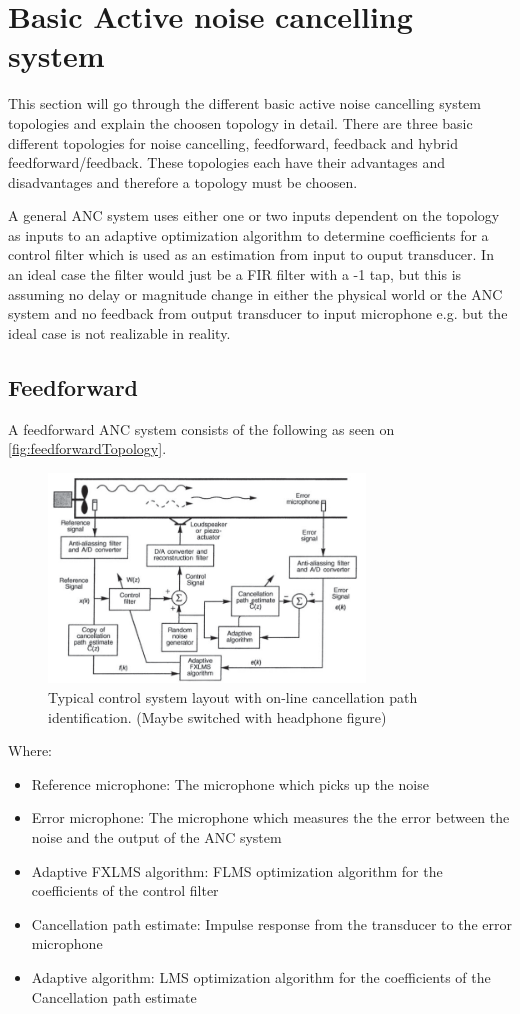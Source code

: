 \section{Basic Active noise cancelling system} \label{sec:BasicSystem}
This section will go through the different basic active noise cancelling system topologies and explain the choosen topology in detail. There are three basic different topologies for noise cancelling, feedforward, feedback and hybrid feedforward/feedback. These topologies each have their advantages and disadvantages and therefore a topology must be choosen.

A general ANC system uses either one or two inputs dependent on the topology as inputs to an adaptive optimization algorithm to determine coefficients for a control filter which is used as an estimation from input to ouput transducer. In an ideal case the filter would just be a FIR filter with a -1 tap, but this is assuming no delay or magnitude change in either the physical world or the ANC system and no feedback from output transducer to input microphone e.g. but the ideal case is not realizable in reality. 

\subsection*{Feedforward}
A feedforward ANC system consists of the following as seen on \autoref{fig:feedforwardTopology}.
\begin{figure}[H]
	\centering
	\includegraphics[width=0.75\textwidth]{figures/BasicSystem/feedforward}
	\caption{Typical control system layout with on-line cancellation path identification. (Maybe switched with headphone figure)}
	\label{fig:feedforwardTopology}
\end{figure}
Where:
\begin{itemize}
\item Reference microphone: The microphone which picks up the noise 
\item Error microphone: The microphone which measures the the error between the noise and the output of the ANC system
\item Adaptive FXLMS algorithm: FLMS optimization algorithm for the coefficients of the control filter
\item Cancellation path estimate: Impulse response from the transducer to the error microphone
\item Adaptive algorithm: LMS optimization algorithm for the coefficients of the Cancellation path estimate 
\end{itemize}
